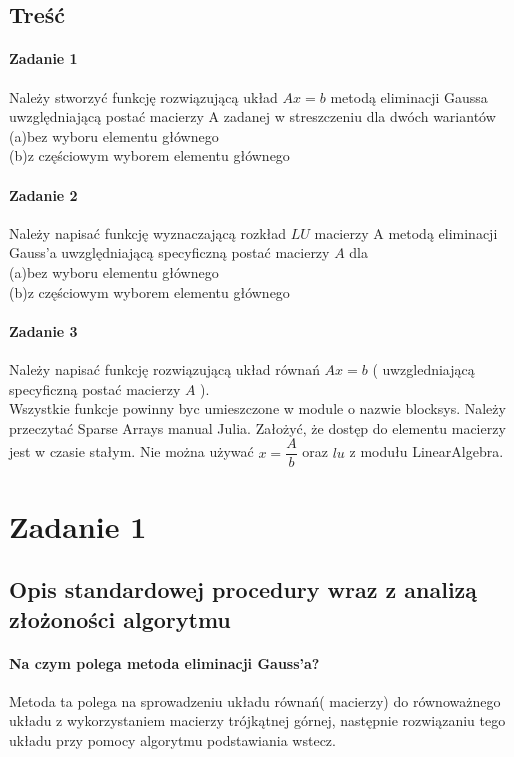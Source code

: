 \documentclass[11pt]{article}
\begin{document}
\begin{flushleft}
\subsection{Treść}
\paragraph{Zadanie 1} Należy stworzyć funkcję rozwiązującą układ $Ax=b$ metodą eliminacji Gaussa uwzględniającą postać macierzy A zadanej w streszczeniu dla dwóch wariantów \\ (a)bez wyboru elementu głównego \\(b)z częściowym wyborem elementu głównego\\ \paragraph{Zadanie 2} Należy napisać funkcję wyznaczającą rozkład $LU$ macierzy A metodą eliminacji Gauss'a uwzględniającą specyficzną postać macierzy $A$ dla \\ (a)bez wyboru elementu głównego \\(b)z częściowym wyborem elementu głównego \\ \paragraph{Zadanie 3} Należy napisać funkcję rozwiązującą układ równań $Ax=b$ ( uwzgledniającą specyficzną postać macierzy $A$ ).\\
\bigskip
Wszystkie funkcje powinny byc umieszczone w module o nazwie blocksys. Należy przeczytać Sparse Arrays manual Julia. Założyć, że dostęp do elementu macierzy jest w czasie stałym. Nie można używać $x=\dfrac{A}{b}$ oraz $lu$ z modułu LinearAlgebra.
\section{Zadanie 1}
\subsection{Opis standardowej procedury wraz z analizą złożoności algorytmu}
\paragraph{Na czym polega metoda eliminacji Gauss'a?}
Metoda ta polega na sprowadzeniu układu równań( macierzy) do równoważnego układu z wykorzystaniem macierzy trójkątnej górnej,  następnie rozwiązaniu tego układu przy pomocy algorytmu podstawiania wstecz.

\end{flushleft}
\end{document}
